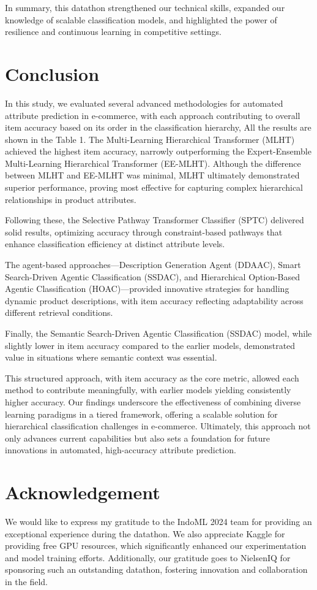 \documentclass[9pt,a4paper,twoside]{rho-class/rho}
\begin{document}
In summary, this datathon strengthened our technical skills, expanded our knowledge of scalable classification models, and highlighted the power of resilience and continuous learning in competitive settings.

\section{Conclusion}
In this study, we evaluated several advanced methodologies for automated attribute prediction in e-commerce, with each approach contributing to overall item accuracy based on its order in the classification hierarchy, All the results are shown in the Table 1. The Multi-Learning Hierarchical Transformer (MLHT) achieved the highest item accuracy, narrowly outperforming the Expert-Ensemble Multi-Learning Hierarchical Transformer (EE-MLHT). Although the difference between MLHT and EE-MLHT was minimal, MLHT ultimately demonstrated superior performance, proving most effective for capturing complex hierarchical relationships in product attributes.

Following these, the Selective Pathway Transformer Classifier (SPTC) delivered solid results, optimizing accuracy through constraint-based pathways that enhance classification efficiency at distinct attribute levels.

The agent-based approaches—Description Generation Agent (DDAAC), Smart Search-Driven Agentic Classification (SSDAC), and Hierarchical Option-Based Agentic Classification (HOAC)—provided innovative strategies for handling dynamic product descriptions, with item accuracy reflecting adaptability across different retrieval conditions.

Finally, the Semantic Search-Driven Agentic Classification (SSDAC) model, while slightly lower in item accuracy compared to the earlier models, demonstrated value in situations where semantic context was essential.

This structured approach, with item accuracy as the core metric, allowed each method to contribute meaningfully, with earlier models yielding consistently higher accuracy. Our findings underscore the effectiveness of combining diverse learning paradigms in a tiered framework, offering a scalable solution for hierarchical classification challenges in e-commerce. Ultimately, this approach not only advances current capabilities but also sets a foundation for future innovations in automated, high-accuracy attribute prediction.

\section{Acknowledgement}
We would like to express my gratitude to the IndoML 2024 team for providing an exceptional experience during the datathon. We also appreciate Kaggle for providing free GPU resources, which significantly enhanced our experimentation and model training efforts. Additionally, our gratitude goes to NielsenIQ for sponsoring such an outstanding datathon, fostering innovation and collaboration in the field.
\end{document}

